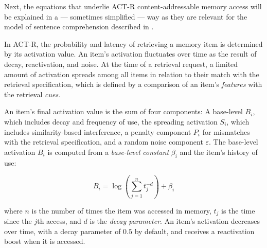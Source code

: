 \documentclass{cambridge7A}\usepackage[]{graphicx}\usepackage[]{color}
\begin{document}
Next, the equations that underlie ACT-R content-addressable memory access will be explained in a --- sometimes simplified --- way as they are relevant for the model of sentence comprehension described in \cite{LewisVasishth2005}.

In ACT-R, the probability and latency of retrieving a memory item is determined by its activation value. An item's activation fluctuates over time as the result of decay, reactivation, and noise. At the time of a retrieval request, a limited amount of activation spreads among all items in relation to their match with the retrieval specification, which is defined by a comparison of an item's \textit{features} with the retrieval \textit{cues}.

An item's final activation value is the sum of four components: A base-level $B_i$, which includes decay and frequency of use, the spreading activation $S_i$, which includes similarity-based interference, a penalty component $P_i$ for mismatches with the retrieval specification, and a random noise component $\varepsilon$. The base-level activation $B_i$ is computed from a \textit{base-level constant} $\beta_i$ and the item's history of use:

\begin{equation}\label{eq:base}
	B_i = \log\left (\sum_{j=1}^n t_j^{-d}\right) + \beta_i
\end{equation}

where $n$ is the number of times the item was accessed in memory, $t_j$ is the time since the $j$th access, and $d$ is the  \textit{decay parameter}. An item's activation decreases over time, with a decay parameter of $0.5$ by default, and receives a reactivation boost when it is accessed. 
\end{document}

